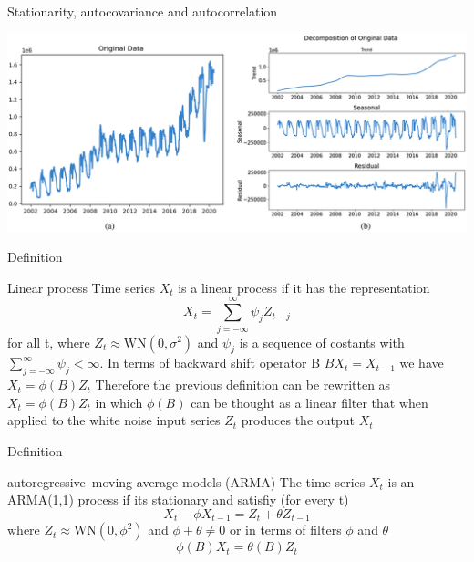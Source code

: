 \documentclass[11pt]{beamer}
\begin{document}
\begin{frame}{Stationarity, autocovariance and autocorrelation \cite{hao2024improving}}
    \begin{center}
     \includegraphics[width=\textwidth]{Pic/Destagionalizzazione.png}
    \end{center}
\end{frame}

\begin{frame}{Definition \cite{brockwell2002introduction}}
\begin{alertblock}{Linear process}
Time series ${X}_{t}$ is a linear process if it has the representation
\begin{equation*}
X_{t}=\sum_{j=-\infty}^{\infty}\psi_{j}Z_{t-j}
\end{equation*}
for all t, where ${Z_{t}}\approx \textrm{WN}(0,\sigma^{2})$ and ${\psi_{j}}$ is a sequence of costants with $\sum_{j=-\infty}^{\infty}\psi_{j} < \infty $. In terms of backward shift operator B $BX_{t}=X_{t-1}$ we have $X_{t}=\phi(B)Z_{t}$ Therefore the previous definition can be rewritten as $X_{t}=\phi(B)Z_{t}$ in which $\phi(B)$ can be thought as a linear filter that when applied to the white noise input series ${Z_{t}}$ produces the output ${X_{t}}$
\end{alertblock}
\end{frame}


\begin{frame}{Definition \cite{brockwell2002introduction}}
\begin{alertblock}{autoregressive–moving-average models (ARMA)}
The time series ${X_{t}}$ is an ARMA(1,1) process if its stationary and satisfiy (for every t) 
\begin{equation*}
X_{t}-\phi X_{t-1}=Z_{t}+\theta Z_{t-1}
\end{equation*}
where $Z_{t} \approx \textrm{WN}(0,\phi^{2})$ and $\phi+\theta \neq 0 $
or in terms of filters $\phi$ and $\theta$
\begin{equation*}
\phi(B)X_{t}=\theta(B)Z_{t}
\end{equation*}
\end{alertblock}
\end{frame}
\end{document}
